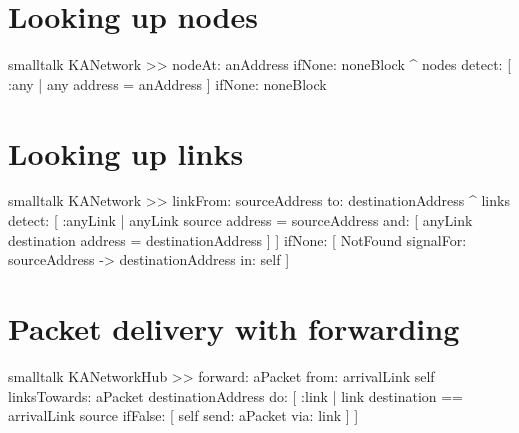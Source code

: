 \documentclass[10pt,twoside,english]{_support/latex/sbabook/sbabook}
\begin{document}
\section{Looking up nodes}
\begin{displaycode}{smalltalk}
KANetwork >> nodeAt: anAddress ifNone: noneBlock
    ^ nodes
        detect: [ :any | any address = anAddress ]
        ifNone: noneBlock
\end{displaycode}
\section{Looking up links}
\begin{displaycode}{smalltalk}
KANetwork >> linkFrom: sourceAddress to: destinationAddress
    ^ links
        detect: [ :anyLink |
            anyLink source address = sourceAddress
                and: [ anyLink destination address = destinationAddress ] ]
        ifNone: [
            NotFound
                signalFor: sourceAddress -> destinationAddress
                in: self ]
\end{displaycode}
\section{Packet delivery with forwarding}
\begin{displaycode}{smalltalk}
KANetworkHub >> forward: aPacket from: arrivalLink
    self
        linksTowards: aPacket destinationAddress
        do: [ :link |
            link destination == arrivalLink source
                ifFalse: [ self send: aPacket via: link ] ]
\end{displaycode}


\backmatter



\end{document}
